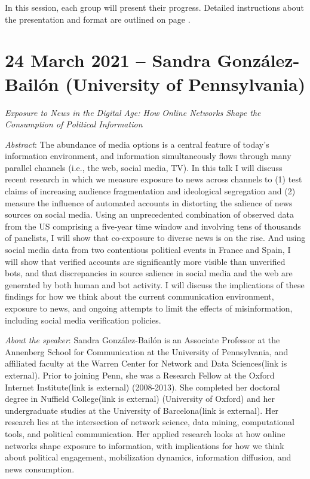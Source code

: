 \documentclass[abstract=on,parskip=full,headings=standardclasses,fontsize=11pt,paper=a4]{scrartcl}
\begin{document}
In this session, each group will present their progress. Detailed instructions about the presentation and format are outlined on page \pageref{presentations}.


\section{24 March 2021 -- Sandra González-Bailón (University of Pennsylvania)}


 \textit{Exposure to News in the Digital Age: How Online Networks Shape the Consumption of Political Information}
 

\textit{Abstract}: The abundance of media options is a central feature of today’s information environment, and information simultaneously flows through many parallel channels (i.e., the web, social media, TV). In this talk I will discuss recent research in which we measure exposure to news across channels to (1) test claims of increasing audience fragmentation and ideological segregation and (2) measure the influence of automated accounts in distorting the salience of news sources on social media. Using an unprecedented combination of observed data from the US comprising a five-year time window and involving tens of thousands of panelists, I will show that co-exposure to diverse news is on the rise. And using social media data from two contentious political events in France and Spain, I will show that verified accounts are significantly more visible than unverified bots, and that discrepancies in source salience in social media and the web are generated by both human and bot activity. I will discuss the implications of these findings for how we think about the current communication environment, exposure to news, and ongoing attempts to limit the effects of misinformation, including social media verification policies.

\textit{About the speaker}: Sandra González-Bailón is an Associate Professor at the Annenberg School for Communication at the University of Pennsylvania, and affiliated faculty at the Warren Center for Network and Data Sciences(link is external). Prior to joining Penn, she was a Research Fellow at the Oxford Internet Institute(link is external) (2008-2013). She completed her doctoral degree in Nuffield College(link is external) (University of Oxford) and her undergraduate studies at the University of Barcelona(link is external). Her research lies at the intersection of network science, data mining, computational tools, and political communication. Her applied research looks at how online networks shape exposure to information, with implications for how we think about political engagement, mobilization dynamics, information diffusion, and news consumption. 
  
\end{document}
